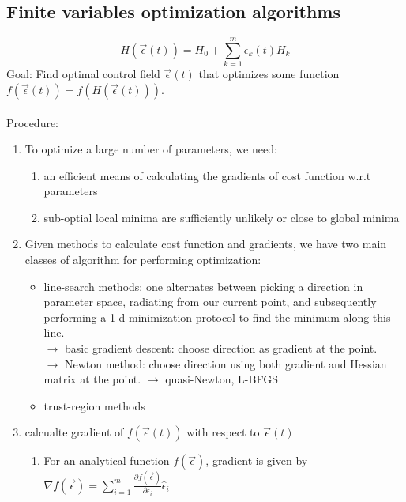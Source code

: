 \documentclass[12pt]{article}
\begin{document}
\subsection{Finite variables optimization algorithms}\label{sec:finite_variables_optimization}
\begin{equation}
    H(\vec{\epsilon}(t)) = H_0 + \sum_{k=1}^m \epsilon_k(t) H_k
\end{equation}
Goal: Find optimal control field $\vec{\epsilon}(t)$ that optimizes some function $f(\vec{\epsilon}(t)) = f(H(\vec{\epsilon}(t)))$. \\
\\
Procedure: 
\begin{enumerate}
    \item To optimize a large number of parameters, we need:
        \begin{enumerate}
            \item an efficient means of calculating the gradients of cost function w.r.t parameters
            \item sub-optial local minima are sufficiently unlikely or close to global minima
        \end{enumerate}
    \item Given methods to calculate cost function and gradients, we have two main classes of algorithm for performing optimization: 
        \begin{itemize}
            \item line-search methods: one alternates between picking a direction in parameter space, radiating from our current point, and subsequently performing a 1-d minimization protocol to find the minimum along this line. \\
                $\rightarrow$ basic gradient descent: choose direction as gradient at the point. \\
                $\rightarrow$ Newton method: choose direction using both gradient and Hessian matrix at the point. $\rightarrow$ quasi-Newton, L-BFGS
            \item trust-region methods
        \end{itemize}
    \item calcualte gradient of $f(\vec{\epsilon}(t))$ with respect to $\vec{\epsilon}(t)$
        \begin{enumerate}
            \item For an analytical function $f(\vec{\epsilon})$, gradient is given by $\nabla f(\vec{\epsilon}) = \sum_{i=1}^m \frac{\partial f(\vec{\epsilon})}{\partial \epsilon_i} \hat{\epsilon}_i$

\end{enumerate}
\end{enumerate}
\end{document}
